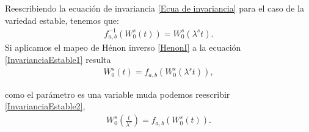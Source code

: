 Reescribiendo la ecuación de invariancia \eqref{Ecua de invariancia} para el caso de la variedad estable, tenemos que:
\begin{eqnarray}
f_{a,b}^{-1}(W_{0}^{s}(t))=W_{0}^{s}(\lambda^{s}t).
\label{InvarianciaEstable1}
\end{eqnarray}
Si aplicamos el mapeo de Hénon inverso \eqref{HenonI} a la ecuación \eqref{InvarianciaEstable1} resulta
\begin{eqnarray}
W_{0}^{s}(t)=f_{a,b}(W_{0}^{s}(\lambda^{s}t)),
\label{InvarianciaEstable2}
\end{eqnarray}

como el parámetro es una variable muda podemos reescribir \eqref{InvarianciaEstable2}, 
\begin{eqnarray}
W_{0}^{s}(\frac{t}{\lambda^{s}})=f_{a,b}(W_{0}^{s}(t)).
\label{InvarianciaEstable3}
\end{eqnarray}

